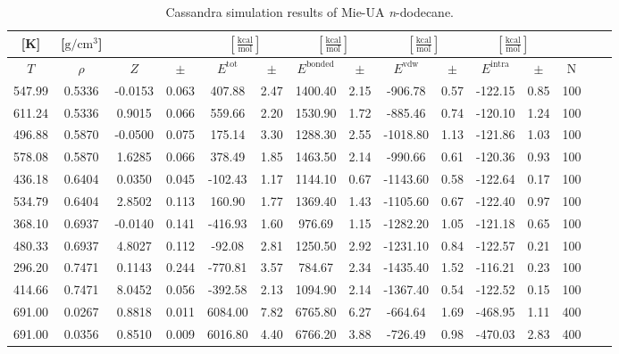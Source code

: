 \documentclass[%
 aip,
 jcp,
 sd,%
 amsmath,amssymb,
]{revtex4-1}
\begin{document}
\begin{table}[!htbp]
\centering
\caption{Cassandra simulation results of Mie-UA \textit{n}-dodecane.}
\label{tab:NIST-VAL-C12-FTT}
\begin{ruledtabular}
\begin{tabular}{ccccccccccccccc}
[K] & [$\mathrm{g/cm^3}$] &  &  & \multicolumn{2}{c}{$[\frac{\mathrm{kcal}}{\mathrm{mol}}]$} & \multicolumn{2}{c}{$[\frac{\mathrm{kcal}}{\mathrm{mol}}]$} & \multicolumn{2}{c}{$[\frac{\mathrm{kcal}}{\mathrm{mol}}]$} &\multicolumn{2}{c}{$[\frac{\mathrm{kcal}}{\mathrm{mol}}]$} & \\
\hline
$T$ & $\rho$ & $Z$ & $\pm$ & $E^{\mathrm{tot}}$ & $\pm$ & $E^{\mathrm{bonded}}$ & $\pm$ & $E^{\mathrm{vdw}}$ & $\pm$ & $E^{\mathrm{intra}}$ & $\pm$ & N\\
\hline
547.99 & 0.5336 & -0.0153 & 0.063 & 407.88  & 2.47  & 1400.40 & 2.15 & -906.78  & 0.57  & -122.15 & 0.85 & 100 \\
611.24 & 0.5336 & 0.9015  & 0.066 & 559.66  & 2.20  & 1530.90 & 1.72 & -885.46  & 0.74  & -120.10 & 1.24 & 100 \\
496.88 & 0.5870 & -0.0500 & 0.075 & 175.14  & 3.30  & 1288.30 & 2.55 & -1018.80 & 1.13  & -121.86 & 1.03 & 100 \\
578.08 & 0.5870 & 1.6285  & 0.066 & 378.49  & 1.85  & 1463.50 & 2.14 & -990.66  & 0.61  & -120.36 & 0.93 & 100 \\
436.18 & 0.6404 & 0.0350  & 0.045 & -102.43 & 1.17  & 1144.10 & 0.67 & -1143.60 & 0.58  & -122.64 & 0.17 & 100 \\
534.79 & 0.6404 & 2.8502  & 0.113 & 160.90  & 1.77  & 1369.40 & 1.43 & -1105.60 & 0.67  & -122.40 & 0.97 & 100 \\
368.10 & 0.6937 & -0.0140 & 0.141 & -416.93 & 1.60  & 976.69  & 1.15 & -1282.20 & 1.05  & -121.18 & 0.65 & 100 \\
480.33 & 0.6937 & 4.8027  & 0.112 & -92.08  & 2.81  & 1250.50 & 2.92 & -1231.10 & 0.84  & -122.57 & 0.21 & 100 \\
296.20 & 0.7471 & 0.1143  & 0.244 & -770.81 & 3.57  & 784.67  & 2.34 & -1435.40 & 1.52  & -116.21 & 0.23 & 100 \\
414.66 & 0.7471 & 8.0452  & 0.056 & -392.58 & 2.13  & 1094.90 & 2.14 & -1367.40 & 0.54  & -122.52 & 0.15 & 100 \\
691.00 & 0.0267 & 0.8818  & 0.011 & 6084.00 & 7.82  & 6765.80 & 6.27 & -664.64  & 1.69  & -468.95 & 1.11 & 400 \\
691.00 & 0.0356 & 0.8510  & 0.009 & 6016.80 & 4.40  & 6766.20 & 3.88 & -726.49  & 0.98  & -470.03 & 2.83 & 400 \\

\end{tabular}
\end{ruledtabular}
\end{table}
\end{document}
